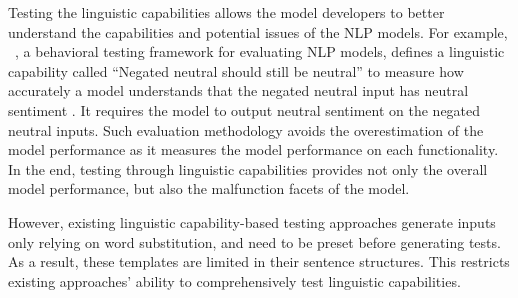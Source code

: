 Testing the linguistic capabilities allows the model developers to
better understand the capabilities and potential issues of the NLP
models.  For example, \Cklst~\cite{marcoACL2020checklist}, a
behavioral testing framework for evaluating NLP models, defines a
linguistic capability called ``Negated neutral should still be
neutral'' to measure how accurately a \sa model understands that the
negated neutral input has neutral sentiment
\cite{marcoACL2020checklist}.  It requires the \sa model to output
neutral sentiment on the negated neutral inputs.  Such evaluation
methodology avoids the overestimation of the model performance as it
measures the model performance on each functionality.
In the end, testing through linguistic capabilities provides not only
the overall model performance, but also the malfunction facets of the
model.

However, existing linguistic capability-based testing approaches
generate inputs only relying on word substitution, and need to be
preset before generating tests.  As a result, these templates are
limited in their sentence structures. This restricts existing
approaches' ability to comprehensively test linguistic capabilities.
  


